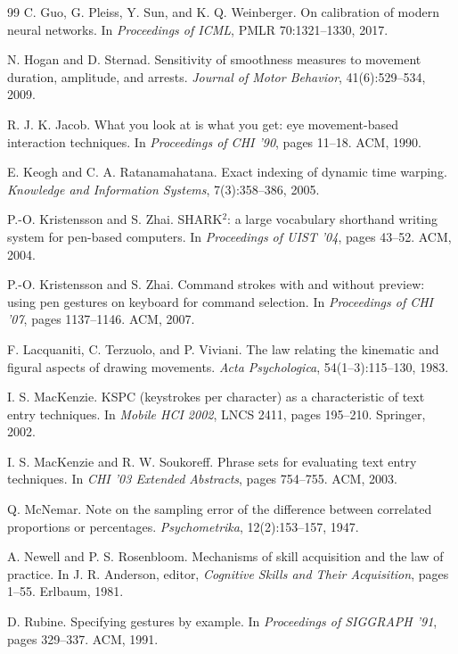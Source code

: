 \begin{thebibliography}{99}
 C. Guo, G. Pleiss, Y. Sun, and K. Q. Weinberger. On calibration of modern neural networks. In \emph{Proceedings of ICML}, PMLR 70:1321--1330, 2017.

 N. Hogan and D. Sternad. Sensitivity of smoothness measures to movement duration, amplitude, and arrests. \emph{Journal of Motor Behavior}, 41(6):529--534, 2009.

 R. J. K. Jacob. What you look at is what you get: eye movement-based interaction techniques. In \emph{Proceedings of CHI '90}, pages 11--18. ACM, 1990.

 E. Keogh and C. A. Ratanamahatana. Exact indexing of dynamic time warping. \emph{Knowledge and Information Systems}, 7(3):358--386, 2005.

 P.-O. Kristensson and S. Zhai. SHARK$^2$: a large vocabulary shorthand writing system for pen-based computers. In \emph{Proceedings of UIST '04}, pages 43--52. ACM, 2004.

 P.-O. Kristensson and S. Zhai. Command strokes with and without preview: using pen gestures on keyboard for command selection. In \emph{Proceedings of CHI '07}, pages 1137--1146. ACM, 2007.

 F. Lacquaniti, C. Terzuolo, and P. Viviani. The law relating the kinematic and figural aspects of drawing movements. \emph{Acta Psychologica}, 54(1--3):115--130, 1983.

 I. S. MacKenzie. KSPC (keystrokes per character) as a characteristic of text entry techniques. In \emph{Mobile HCI 2002}, LNCS 2411, pages 195--210. Springer, 2002.

 I. S. MacKenzie and R. W. Soukoreff. Phrase sets for evaluating text entry techniques. In \emph{CHI '03 Extended Abstracts}, pages 754--755. ACM, 2003.

 Q. McNemar. Note on the sampling error of the difference between correlated proportions or percentages. \emph{Psychometrika}, 12(2):153--157, 1947.

 A. Newell and P. S. Rosenbloom. Mechanisms of skill acquisition and the law of practice. In J. R. Anderson, editor, \emph{Cognitive Skills and Their Acquisition}, pages 1--55. Erlbaum, 1981.

 D. Rubine. Specifying gestures by example. In \emph{Proceedings of SIGGRAPH '91}, pages 329--337. ACM, 1991.


\end{thebibliography}
